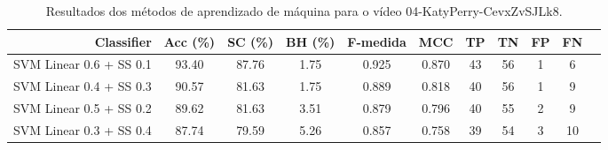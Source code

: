\begin{table}[!htb]
\centering
\caption{Resultados dos métodos de aprendizado de máquina para o vídeo 04-KatyPerry-CevxZvSJLk8.}
\label{tab:04-KatyPerry-CevxZvSJLk8}
\begin{tabular}{r|c|c|c|c|c|c|c|c|c|c}
\hline\hline
Classifier & Acc (\%) & SC (\%) & BH (\%) & F-medida & MCC & TP & TN & FP & FN \\ \hline
SVM Linear 0.6 + SS 0.1 & 93.40 & 87.76 & 1.75 & 0.925 & 0.870 & 43 & 56 & 1 & 6 \\ 
SVM Linear 0.4 + SS 0.3 & 90.57 & 81.63 & 1.75 & 0.889 & 0.818 & 40 & 56 & 1 & 9 \\ 
SVM Linear 0.5 + SS 0.2 & 89.62 & 81.63 & 3.51 & 0.879 & 0.796 & 40 & 55 & 2 & 9 \\ 
SVM Linear 0.3 + SS 0.4 & 87.74 & 79.59 & 5.26 & 0.857 & 0.758 & 39 & 54 & 3 & 10 \\ 
\hline\hline
\end{tabular}
\end{table}
